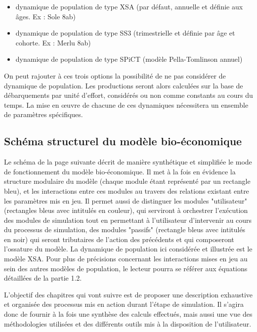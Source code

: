 \documentclass[12pt, colorinlistoftodos]{article}
\begin{document}
\begin{itemize}
    \item dynamique de population de type XSA (par défaut, annuelle et définie aux âges. Ex : Sole 8ab)
    \item dynamique de population de type SS3 (trimestrielle et définie par âge et cohorte. Ex : Merlu 8ab)
    \item dynamique de population de type SPiCT (modèle Pella-Tomlinson  annuel)
\end{itemize}

On peut rajouter à ces trois options la possibilité de ne pas considérer de dynamique de population. 
Les productions seront alors calculées sur  la base de débarquements par unité d'effort, considérés 
ou non comme constants au cours du temps. La mise en œuvre de chacune de ces dynamiques nécessitera un 
ensemble de paramètres spécifiques. 

\subsection{Schéma structurel du modèle bio-économique}

Le schéma de la page suivante décrit de manière synthétique et simplifiée le mode de fonctionnement du modèle bio-économique.
Il met à la fois en évidence la structure modulaire du modèle (chaque module étant représenté par un rectangle bleu), 
et les interactions entre ces modules au travers des relations existant entre les  paramètres mis en jeu. 
Il permet aussi de distinguer les modules "utilisateur" (rectangles bleus avec intitulés en couleur), 
qui serviront à orchestrer l'exécution des modules de simulation tout en permettant à l'utilisateur 
d'intervenir au cours du processus de simulation, des modules "passifs"  (rectangle bleus avec intitulés en noir) 
qui seront tributaires de l'action des précédents et qui composeront l'ossature du modèle. 
La dynamique de population ici considérée et illustrée est le modèle XSA. 
Pour plus de précisions concernant les interactions mises en jeu au sein des autres modèles de population, 
le lecteur pourra se référer aux équations détaillées de la partie 1.2.

L'objectif des  chapitres qui vont suivre est de proposer une description exhaustive et organisée des 
processus mis en action durant l'étape de simulation. Il s'agira donc de fournir à la fois une synthèse 
des calculs effectués, mais aussi une vue des méthodologies utilisées et des différents outils mis à 
la disposition de l'utilisateur.
\end{document}
